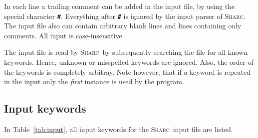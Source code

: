 \documentclass[a4paper,10pt,DIV=15,openany]{scrbook}
\newcommand{\sharc}{\textsc{Sharc}}
\newcommand{\ttt}[1]{\textbf{\texttt{#1}}}
\begin{document}
In each line a trailing comment can be added in the input file, by using the special character \ttt{\#}. Everything after \ttt{\#} is ignored by the input parser of \sharc. The input file also can contain arbitrary blank lines and lines containing only comments. All input is case-insensitive.

The input file is read by \sharc\ by subsequently searching the file for all known keywords. Hence, unknown or misspelled keywords are ignored. Also, the order of the keywords is completely arbitray. Note however, that if a keyword is repeated in the input only the \textit{first} instance is used by the program. 

\subsection{Input keywords}

In Table~\ref{tab:input}, all input keywords for the \sharc\ input file are listed.
\end{document}
